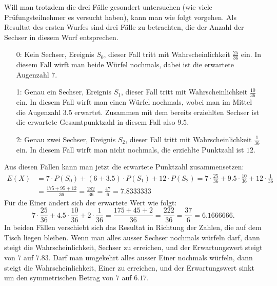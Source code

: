\begin{loesung}
Will man trotzdem die drei Fälle gesondert untersuchen (wie
viele Prüfungsteilnehmer es versucht haben), kann man wie
folgt vorgehen.
Als Resultat des ersten Wurfes sind drei Fälle zu betrachten, die
der Anzahl der Sechser in diesem Wurf entsprechen.
\begin{itemize}
\item[0:] Kein Sechser, Ereignis $S_0$, dieser Fall tritt mit Wahrscheinlichkeit
$\frac{25}{36}$ ein.  In diesem Fall wirft man beide Würfel nochmals,
dabei ist die erwartete Augenzahl $7$.
\item[1:] Genau ein Sechser, Ereignis $S_1$,
dieser Fall tritt mit Wahrscheinlichkeit
$\frac{10}{36}$ ein.  In diesem Fall wirft man einen Würfel nochmals,
wobei man im Mittel die Augenzahl $3.5$ erwartet.  Zusammen mit dem
bereits erziehlten Sechser ist die erwartete Gesamtpunktzahl in diesem
Fall also $9.5$.
\item[2:] Genau zwei Sechser, Ereignis $S_2$,
dieser Fall tritt mit Wahrscheinlichkeit
$\frac{1}{36}$ ein.  In diesem Fall wirft man nicht nochmals, die
erziehlte Punktzahl ist $12$.
\end{itemize}
Aus diesen Fällen kann man jetzt die erwartete Punktzahl zusammensetzen:
\begin{align*}
E(X)&=
7 \cdot P(S_0) + (6 + 3.5)\cdot P(S_1) + 12\cdot P(S_2)
=
7\cdot \frac{25}{36}
+
9.5\cdot \frac{10}{36}
+
12\cdot\frac{1}{36}
\\
&=
\frac{175+95+12}{36}=\frac{282}{36}=\frac{47}{6}
=7.8333333
\end{align*}
Für die Einer ändert sich der erwartete Wert wie folgt:
\[
7\cdot \frac{25}{36}
+
4.5\cdot \frac{10}{36}
+
2\cdot\frac{1}{36}
=
\frac{175+45+2}{36}=\frac{222}{36}=\frac{37}{6}
=6.1666666.
\]
In beiden Fällen verschiebt sich das Resultat in Richtung der Zahlen,
die auf dem Tisch liegen bleiben. Wenn man alles ausser Sechser nochmals
würfeln darf, dann steigt die Wahrscheinlichkeit, Sechser zu erreichen,
und der Erwartungswert steigt von $7$ auf $7.83$. Darf man umgekehrt alles
ausser Einer nochmals würfeln, dann steigt die Wahrscheinlichkeit,
Einer zu erreichen, und der Erwartungswert sinkt um den symmetrischen Betrag
von $7$ auf $6.17$.
\end{loesung}

